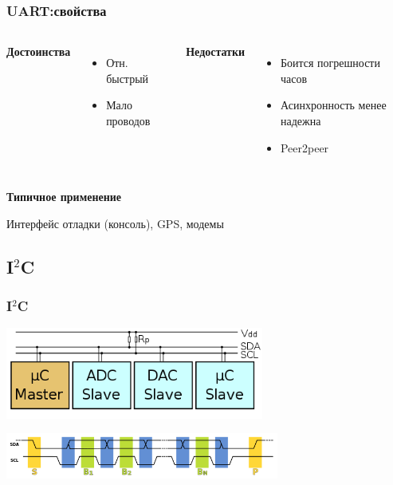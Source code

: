 \begin{frame}
  \frametitle{UART:свойства}
  \begin{columns}
    \column{4cm}
    \begin{center}
      {\bf\large Достоинства}
    \end{center}
    \begin{itemize}
       \item Отн. быстрый
       \item Мало проводов
    \end{itemize}
    \column{4cm}
    \begin{center}
      {\bf\large Недостатки}
    \end{center}
    \begin{itemize}
       \item Боится погрешности часов 
       \item Асинхронность менее надежна
       \item Peer2peer
    \end{itemize}
  \end{columns}
  \begin{center}
    {\bf\large Типичное применение}
  \end{center}
  Интерфейс отладки (консоль), GPS, модемы
\end{frame}
\subsection{I$^2$C}   
\begin{frame}
  \frametitle{I$^2$C}
  \begin{center}
    \includegraphics[height=3cm]{I2C.png}
    \vspace{0.3cm}

    \includegraphics[height=1.5cm]{600px-I2C_data_transfer.png}
  \end{center}
\end{frame}

